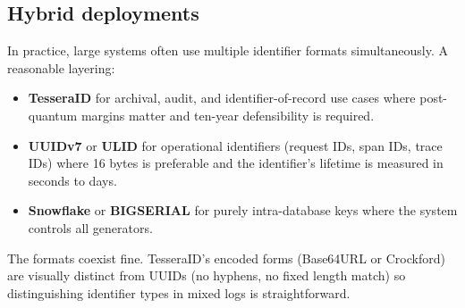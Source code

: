 \subsection{Hybrid deployments}

In practice, large systems often use multiple identifier formats simultaneously. A reasonable layering:

\begin{itemize}
  \item \textbf{TesseraID} for archival, audit, and identifier-of-record use cases where post-quantum margins matter and ten-year defensibility is required.
  \item \textbf{UUIDv7} or \textbf{ULID} for operational identifiers (request IDs, span IDs, trace IDs) where 16 bytes is preferable and the identifier's lifetime is measured in seconds to days.
  \item \textbf{Snowflake} or \textbf{BIGSERIAL} for purely intra-database keys where the system controls all generators.
\end{itemize}

The formats coexist fine. TesseraID's encoded forms (Base64URL or Crockford) are visually distinct from UUIDs (no hyphens, no fixed length match) so distinguishing identifier types in mixed logs is straightforward.


